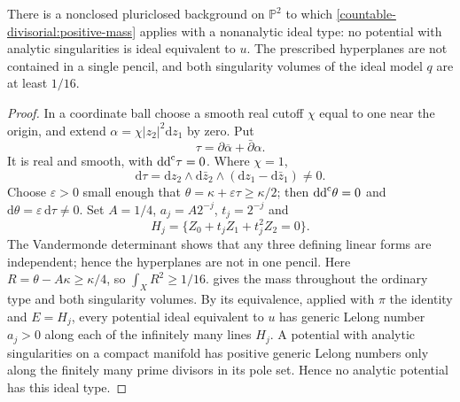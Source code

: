 \begin{example}\label{countable-divisorial:nonclosed-example}
There is a nonclosed pluriclosed background on $\mathbb P^2$
to which \cref{countable-divisorial:positive-mass} applies with a
nonanalytic ideal type: no potential with analytic singularities is
ideal equivalent to $u$. The prescribed
hyperplanes are not contained in a single pencil, and both
singularity volumes of the ideal model $q$ are at least $1/16$.
\end{example}
\begin{proof}
In a coordinate ball choose a smooth real cutoff $\chi$ equal
to one near the origin, and extend
$\alpha=\chi|z_2|^2\mathrm dz_1$ by zero. Put
\[
 \tau=\partial\overline\alpha+\bar\partial\alpha.
\]
It is real and smooth, with $\mathrm{dd}^{\mathrm{c}}\tau=0$. Where $\chi=1$,
\[
 \mathrm d\tau=\mathrm dz_2\wedge\mathrm d\bar z_2
                  \wedge(\mathrm dz_1-\mathrm d\bar z_1)\ne0.
\]
Choose $\varepsilon>0$ small enough that
$\theta=\kappa+\varepsilon\tau\geq\kappa/2$; then $\mathrm{dd}^{\mathrm{c}}\theta=0$
and $\mathrm d\theta=\varepsilon\,\mathrm d\tau\neq0$.
Set $A=1/4$, $a_j=A2^{-j}$, $t_j=2^{-j}$ and
\[
 H_j=\{Z_0+t_jZ_1+t_j^2Z_2=0\}.
\]
The Vandermonde determinant shows that any three defining
linear forms are independent; hence the hyperplanes are not
in one pencil. Here $R=\theta-A\kappa\geq\kappa/4$, so
$\int_XR^2\geq1/16$.  gives the
mass throughout the ordinary type and both singularity volumes.
By its equivalence, applied with $\pi$ the identity and $E=H_j$,
every potential ideal equivalent to $u$ has generic Lelong number
$a_j>0$ along each of the infinitely many lines $H_j$. A potential with analytic
singularities on a compact manifold has positive generic Lelong
numbers only along the finitely many prime divisors in its pole set.
Hence no analytic potential has this ideal type.
\end{proof}
